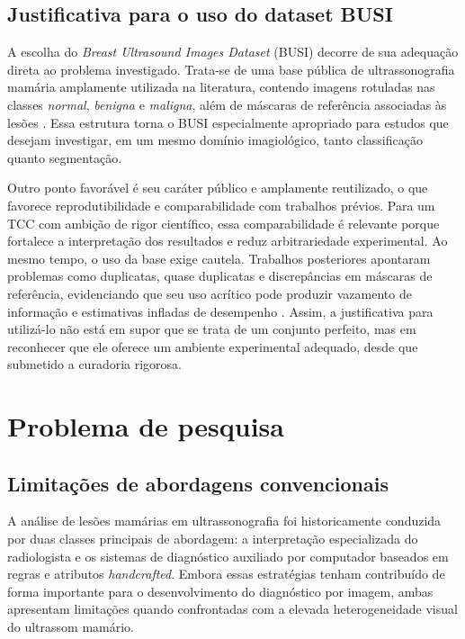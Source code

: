 \documentclass[tcc,capa]{texufpel}
\begin{document}
\subsection{Justificativa para o uso do dataset BUSI}

A escolha do \textit{Breast Ultrasound Images Dataset} (BUSI) decorre de sua adequação direta ao problema investigado. Trata-se de uma base pública de ultrassonografia mamária amplamente utilizada na literatura, contendo imagens rotuladas nas classes \textit{normal}, \textit{benigna} e \textit{maligna}, além de máscaras de referência associadas às lesões \cite{AlDhabyani2020}. Essa estrutura torna o BUSI especialmente apropriado para estudos que desejam investigar, em um mesmo domínio imagiológico, tanto classificação quanto segmentação.

Outro ponto favorável é seu caráter público e amplamente reutilizado, o que favorece reprodutibilidade e comparabilidade com trabalhos prévios. Para um TCC com ambição de rigor científico, essa comparabilidade é relevante porque fortalece a interpretação dos resultados e reduz arbitrariedade experimental. Ao mesmo tempo, o uso da base exige cautela. Trabalhos posteriores apontaram problemas como duplicatas, quase duplicatas e discrepâncias em máscaras de referência, evidenciando que seu uso acrítico pode produzir vazamento de informação e estimativas infladas de desempenho \cite{Pawlowska2023}. Assim, a justificativa para utilizá-lo não está em supor que se trata de um conjunto perfeito, mas em reconhecer que ele oferece um ambiente experimental adequado, desde que submetido a curadoria rigorosa.

\section{Problema de pesquisa}

\subsection{Limitações de abordagens convencionais}

A análise de lesões mamárias em ultrassonografia foi historicamente conduzida por duas classes principais de abordagem: a interpretação especializada do radiologista e os sistemas de diagnóstico auxiliado por computador baseados em regras e atributos \textit{handcrafted}. Embora essas estratégias tenham contribuído de forma importante para o desenvolvimento do diagnóstico por imagem, ambas apresentam limitações quando confrontadas com a elevada heterogeneidade visual do ultrassom mamário.
\end{document}

